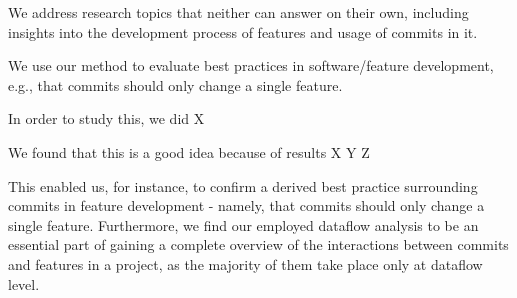 We address research topics that neither can answer on their own, including insights into the development process of features and usage of commits in it. %

We use our method to evaluate best practices in software/feature development, e.g., that commits should only change a single feature.

In order to study this, we did X

We found that this is a good idea because of results X Y Z

This enabled us, for instance, to confirm a derived best practice surrounding commits in feature development - namely, that commits should only change a single feature.
Furthermore, we find our employed dataflow analysis to be an essential part of gaining a complete overview of the interactions between commits and features in a project, as the majority of them take place only at dataflow level.




\fi 

\vfill

\endgroup

\vfill
